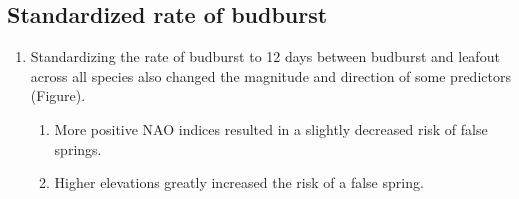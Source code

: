\documentclass{article}\usepackage[]{graphicx}\usepackage[]{color}
\begin{document}
\subsection*{Standardized rate of budburst}
\begin{enumerate}
  
\item Standardizing the rate of budburst to 12 days between budburst and leafout across all species also changed the magnitude and direction of some predictors (Figure). %
  \begin{enumerate}
  \item More positive NAO indices resulted in a slightly decreased risk of false springs. 
  \item Higher elevations greatly increased the risk of a false spring.
\end{enumerate}
\end{enumerate}
\end{document}
